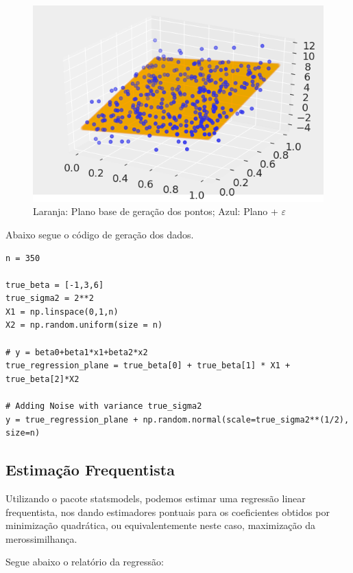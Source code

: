\documentclass[12pt,letterpaper]{article}
\newcommand{\eps}{\varepsilon}
\begin{document}
	\begin{figure}[!htb]
		\centering
		\includegraphics[scale=0.71]{../images/generated_data.png}
		\caption{Laranja: Plano base de geração dos pontos; Azul: Plano + $\eps$}
		\label{data1}
	\end{figure}

Abaixo segue o código de geração dos dados.

	\begin{lstlisting}[language=iPython]
n = 350

true_beta = [-1,3,6]
true_sigma2 = 2**2
X1 = np.linspace(0,1,n)
X2 = np.random.uniform(size = n)

# y = beta0+beta1*x1+beta2*x2
true_regression_plane = true_beta[0] + true_beta[1] * X1 + true_beta[2]*X2

# Adding Noise with variance true_sigma2
y = true_regression_plane + np.random.normal(scale=true_sigma2**(1/2), size=n)
	\end{lstlisting}
	
	\subsection{Estimação Frequentista}
 Utilizando o pacote statsmodels, podemos estimar uma regressão linear frequentista, nos dando estimadores pontuais para os coeficientes obtidos por minimização quadrática, ou equivalentemente neste caso, maximização da merossimilhança.
 
 Segue abaixo o relatório da regressão:
 
\end{document}
